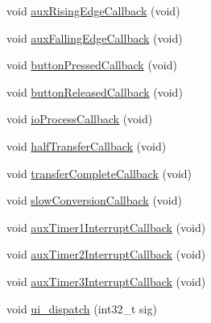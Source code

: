 \begin{DoxyCompactItemize}
\item 
void \mbox{\hyperlink{class_via_gateseq_abc5e90e7f9a624e25691c6d202bac2eb}{aux\+Rising\+Edge\+Callback}} (void)
\item 
void \mbox{\hyperlink{class_via_gateseq_abbca505b971596d4233e27df76e37655}{aux\+Falling\+Edge\+Callback}} (void)
\item 
void \mbox{\hyperlink{class_via_gateseq_a0871606bcbd5b671c1326d1218f264a3}{button\+Pressed\+Callback}} (void)
\item 
void \mbox{\hyperlink{class_via_gateseq_aa18b0d84c686c7c7339df8f9bee38e45}{button\+Released\+Callback}} (void)
\item 
void \mbox{\hyperlink{class_via_gateseq_aee67d45c3237dc013222192e97b4ea4c}{io\+Process\+Callback}} (void)
\item 
void \mbox{\hyperlink{class_via_gateseq_a4760dc9a5a8b5d82d8ddb83595bff37a}{half\+Transfer\+Callback}} (void)
\item 
void \mbox{\hyperlink{class_via_gateseq_a3058dd33ab526baa7be92d741c455fe2}{transfer\+Complete\+Callback}} (void)
\item 
void \mbox{\hyperlink{class_via_gateseq_a5f5dbb45776ebd8eb39735b96cb246c5}{slow\+Conversion\+Callback}} (void)
\item 
void \mbox{\hyperlink{class_via_gateseq_a6085ddc82767c564111bac2341d91bb1}{aux\+Timer1\+Interrupt\+Callback}} (void)
\item 
void \mbox{\hyperlink{class_via_gateseq_ab668f9ea55345495e233d4fb2b34ac48}{aux\+Timer2\+Interrupt\+Callback}} (void)
\item 
void \mbox{\hyperlink{class_via_gateseq_ad2af84e2865d64543a0e9d7e48ea5140}{aux\+Timer3\+Interrupt\+Callback}} (void)
\item 
void \mbox{\hyperlink{class_via_gateseq_aaca5689865a460afca19c9b73e67e236}{ui\+\_\+dispatch}} (int32\+\_\+t sig)
\end{DoxyCompactItemize}
